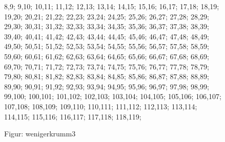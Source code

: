 \documentclass[a4paper,10pt,ngerman]{scrartcl}
\begin{document}
\begin{figure}[!h]
{            8,9;
            9,10;
            10,11;
            11,12;
            12,13;
            13,14;
            14,15;
            15,16;
            16,17;
            17,18;
            18,19;
            19,20;
            20,21;
            21,22;
            22,23;
            23,24;
            24,25;
            25,26;
            26,27;
            27,28;
            28,29;
            29,30;
            30,31;
            31,32;
            32,33;
            33,34;
            34,35;
            35,36;
            36,37;
            37,38;
            38,39;
            39,40;
            40,41;
            41,42;
            42,43;
            43,44;
            44,45;
            45,46;
            46,47;
            47,48;
            48,49;
            49,50;
            50,51;
            51,52;
            52,53;
            53,54;
            54,55;
            55,56;
            56,57;
            57,58;
            58,59;
            59,60;
            60,61;
            61,62;
            62,63;
            63,64;
            64,65;
            65,66;
            66,67;
            67,68;
            68,69;
            69,70;
            70,71;
            71,72;
            72,73;
            73,74;
            74,75;
            75,76;
            76,77;
            77,78;
            78,79;
            79,80;
            80,81;
            81,82;
            82,83;
            83,84;
            84,85;
            85,86;
            86,87;
            87,88;
            88,89;
            89,90;
            90,91;
            91,92;
            92,93;
            93,94;
            94,95;
            95,96;
            96,97;
            97,98;
            98,99;
            99,100;
            100,101;
            101,102;
            102,103;
            103,104;
            104,105;
            105,106;
            106,107;
            107,108;
            108,109;
            109,110;
            110,111;
            111,112;
            112,113;
            113,114;
            114,115;
            115,116;
            116,117;
            117,118;
            118,119;
        }
        \caption{Figur: wenigerkrumm3}
        \label{fig:wenigerkrumm3}
    \end{figure}
\end{document}
